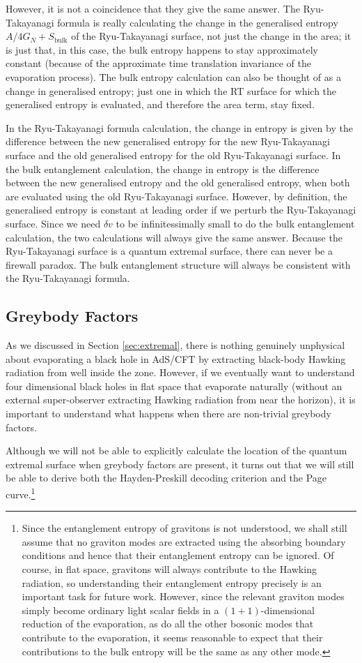 \documentclass[12pt]{article}
\begin{document}
However, it is not a coincidence that they give the same answer. The Ryu-Takayanagi formula is really calculating the change in the generalised entropy $A/4G_N + S_\text{bulk}$ of the Ryu-Takayanagi surface, not just the change in the area; it is just that, in this case, the bulk entropy happens to stay approximately constant (because of the approximate time translation invariance of the evaporation process). The bulk entropy calculation can also be thought of as a change in generalised entropy; just one in which the RT surface for which the generalised entropy is evaluated, and therefore the area term, stay fixed. 

In the Ryu-Takayanagi formula calculation, the change in entropy is given by the difference between the new generalised entropy for the new Ryu-Takayanagi surface and the old generalised entropy for the old Ryu-Takayanagi surface. In the bulk entanglement calculation, the change in entropy is the difference between the new generalised entropy and the old generalised entropy, when both are evaluated using the old Ryu-Takayanagi surface. However, by definition, the generalised entropy is constant at leading order if we perturb the Ryu-Takayanagi surface. Since we need $\delta v$ to be infinitessimally small to do the bulk entanglement calculation, the two calculations will always give the same answer. Because the Ryu-Takayanagi surface is a quantum extremal surface, there can never be a firewall paradox. The bulk entanglement structure will always be consistent with the Ryu-Takayanagi formula.

\subsection{Greybody Factors} \label{sec:greybody}
As we discussed in Section \ref{sec:extremal}, there is nothing genuinely unphysical about evaporating a black hole in AdS/CFT by extracting black-body Hawking radiation from well inside the zone. However,  if we eventually want to understand four dimensional black holes in flat space that evaporate naturally (without an external super-observer extracting Hawking radiation from near the horizon), it is important to understand what happens when there are non-trivial greybody factors. 

Although we will not be able to explicitly calculate the location of the quantum extremal surface when greybody factors are present, it turns out that we will still be able to derive both the Hayden-Preskill decoding criterion and the Page curve.\footnote{Since the entanglement entropy of gravitons is not understood, we shall still assume that no graviton modes are extracted using the absorbing boundary conditions and hence that their entanglement entropy can be ignored. Of course, in flat space, gravitons will always contribute to the Hawking radiation, so understanding their entanglement entropy precisely is an important task for future work. However, since the relevant graviton modes simply become ordinary light scalar fields in a $(1+1)$-dimensional reduction of the evaporation, as do all the other bosonic modes that contribute to the evaporation, it seems reasonable to expect that their contributions to the bulk entropy will be the same as any other mode.}
\end{document}
